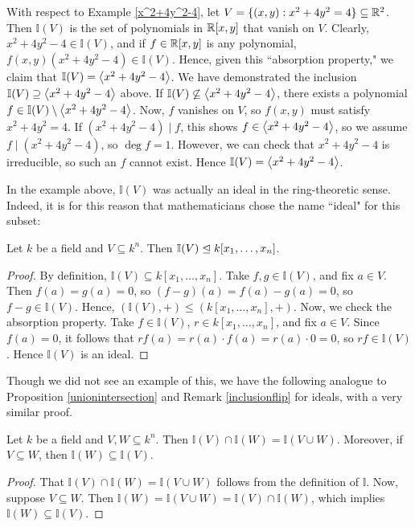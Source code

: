 \documentclass{article}
\newcommand{\I}{\mathbb I}
\begin{document}
\begin{example}\label{idealcomputation}
With respect to Example \ref{x^2+4y^2-4}, let $V = \{(x,y): x^2 + 4y^2 = 4\}\subseteq \mathbb R^2$. Then $\I(V)$ is the set of polynomials in $\mathbb R[x,y]$ that vanish on $V$. Clearly, $x^2+4y^2-4\in \I(V)$, and if $f\in \mathbb R[x,y]$ is any polynomial, $f(x,y)(x^2+4y^2-4)\in \I(V)$. Hence, given this ``absorption property," we claim that $\I(V) = \gen{x^2+4y^2-4}$. We have demonstrated the inclusion $\I(V)\supseteq \gen{x^2 +4y^2-4}$ above. If $\I(V)\not\subseteq \gen{x^2+4y^2-4}$, there exists a polynomial $f\in \I(V)\setminus \gen{x^2+4y^2-4}$. Now, $f$ vanishes on $V$, so $f(x,y)$ must satisfy $x^2+4y^2 = 4$. If $(x^2+4y^2-4) \mid f$, this shows $f\in \left\langle x^2+4y^2-4\right\rangle$, so we assume $f\mid (x^2+4y^2-4)$, so $\deg f = 1$. However, we can check that $x^2+4y^2-4$ is irreducible, so such an $f$ cannot exist. Hence $\I(V) = \gen{x^2+4y^2-4}$.
\end{example}

In the example above, $\I(V)$ was actually an ideal in the ring-theoretic sense. Indeed, it is for this reason that mathematicians chose the name ``ideal" for this subset:
\begin{proposition}
Let $k$ be a field and $V\subseteq k^n$. Then $\I(V) \furina k[x_1, \ldots, x_n]$.
\end{proposition}
\begin{proof}
By definition, $\I(V) \subseteq k[x_1, \ldots, x_n]$. Take $f, g\in \I(V)$, and fix $a\in V$. Then $f(a) = g(a) = 0$, so $(f-g)(a) = f(a) - g(a) = 0$, so $f - g \in \I(V)$. Hence, $(\I(V), +) \leq (k[x_1, \ldots, x_n], +)$. Now, we check the absorption property. Take $f\in \I(V)$, $r\in k[x_1, \ldots, x_n]$, and fix $a\in V$. Since $f(a) = 0$, it follows that $rf(a) = r(a) \cdot f(a) = r(a)\cdot 0 = 0$, so $rf\in \I(V)$. Hence $\I(V)$ is an ideal.
\end{proof}

Though we did not see an example of this, we have the following analogue to Proposition \ref{unionintersection} and Remark \ref{inclusionflip} for ideals, with a very similar proof.
\begin{proposition}\label{idealflip}
Let $k$ be a field and $V, W\subseteq k^n$. Then $\I(V)\cap\I(W) = \I(V\cup W)$. Moreover, if $V\subseteq W$, then $\I(W)\subseteq \I(V)$.
\end{proposition}
\begin{proof}
That $\I(V)\cap \I(W)=\I(V\cup W)$ follows from the definition of $\I$. Now, suppose $V\subseteq W$. Then $\I(W) = \I(V\cup W) = \I(V)\cap \I(W)$, which implies $\I(W)\subseteq \I(V)$.
\end{proof}
\end{document}
